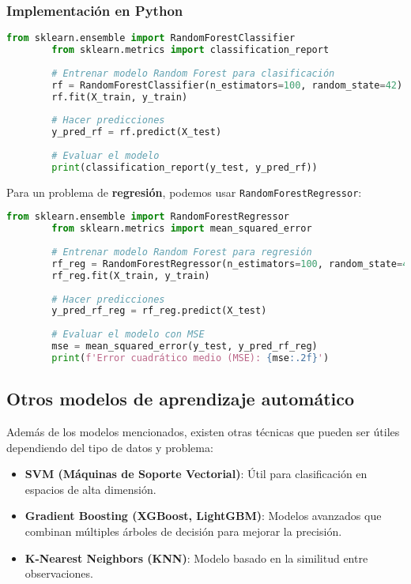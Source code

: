 \documentclass{book}
\begin{document}
	\subsubsection{Implementación en Python}
	
	\begin{lstlisting}[language=Python, caption=Entrenamiento de Random Forest]
		from sklearn.ensemble import RandomForestClassifier
		from sklearn.metrics import classification_report
		
		# Entrenar modelo Random Forest para clasificación
		rf = RandomForestClassifier(n_estimators=100, random_state=42)
		rf.fit(X_train, y_train)
		
		# Hacer predicciones
		y_pred_rf = rf.predict(X_test)
		
		# Evaluar el modelo
		print(classification_report(y_test, y_pred_rf))
	\end{lstlisting}
	
	Para un problema de \textbf{regresión}, podemos usar \texttt{RandomForestRegressor}:
	
	\begin{lstlisting}[language=Python, caption=Entrenamiento de Random Forest para regresión]
		from sklearn.ensemble import RandomForestRegressor
		from sklearn.metrics import mean_squared_error
		
		# Entrenar modelo Random Forest para regresión
		rf_reg = RandomForestRegressor(n_estimators=100, random_state=42)
		rf_reg.fit(X_train, y_train)
		
		# Hacer predicciones
		y_pred_rf_reg = rf_reg.predict(X_test)
		
		# Evaluar el modelo con MSE
		mse = mean_squared_error(y_test, y_pred_rf_reg)
		print(f'Error cuadrático medio (MSE): {mse:.2f}')
	\end{lstlisting}
	
	\subsection{Otros modelos de aprendizaje automático}
	
	Además de los modelos mencionados, existen otras técnicas que pueden ser útiles dependiendo del tipo de datos y problema:
	
	\begin{itemize}
		\item \textbf{SVM (Máquinas de Soporte Vectorial)}: Útil para clasificación en espacios de alta dimensión.
		\item \textbf{Gradient Boosting (XGBoost, LightGBM)}: Modelos avanzados que combinan múltiples árboles de decisión para mejorar la precisión.
		\item \textbf{K-Nearest Neighbors (KNN)}: Modelo basado en la similitud entre observaciones.
	\end{itemize}
	
\end{document}
